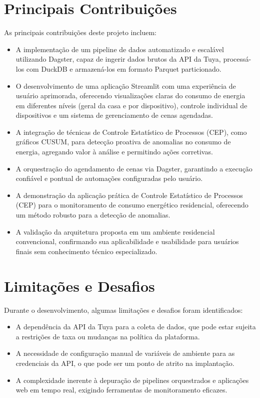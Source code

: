 \section{Principais Contribuições}
\label{sec:contribuicoes}
As principais contribuições deste projeto incluem:
\begin{itemize}
    \item A implementação de um pipeline de dados automatizado e escalável utilizando Dagster, capaz de ingerir dados brutos da API da Tuya, processá-los com DuckDB e armazená-los em formato Parquet particionado.
    \item O desenvolvimento de uma aplicação Streamlit com uma experiência de usuário aprimorada, oferecendo visualizações claras do consumo de energia em diferentes níveis (geral da casa e por dispositivo), controle individual de dispositivos e um sistema de gerenciamento de cenas agendadas.
    \item A integração de técnicas de Controle Estatístico de Processos (CEP), como gráficos CUSUM, para detecção proativa de anomalias no consumo de energia, agregando valor à análise e permitindo ações corretivas.
    \item A orquestração do agendamento de cenas via Dagster, garantindo a execução confiável e pontual de automações configuradas pelo usuário.
    \item A demonstração da aplicação prática de Controle Estatístico de Processos (CEP) para o monitoramento de consumo energético residencial, oferecendo um método robusto para a detecção de anomalias.
    \item A validação da arquitetura proposta em um ambiente residencial convencional, confirmando sua aplicabilidade e usabilidade para usuários finais sem conhecimento técnico especializado.
\end{itemize}

\section{Limitações e Desafios}
\label{sec:limitacoes}
Durante o desenvolvimento, algumas limitações e desafios foram identificados:
\begin{itemize}
    \item A dependência da API da Tuya para a coleta de dados, que pode estar sujeita a restrições de taxa ou mudanças na política da plataforma.
    \item A necessidade de configuração manual de variáveis de ambiente para as credenciais da API, o que pode ser um ponto de atrito na implantação.
    \item A complexidade inerente à depuração de pipelines orquestrados e aplicações web em tempo real, exigindo ferramentas de monitoramento eficazes.
\end{itemize}
